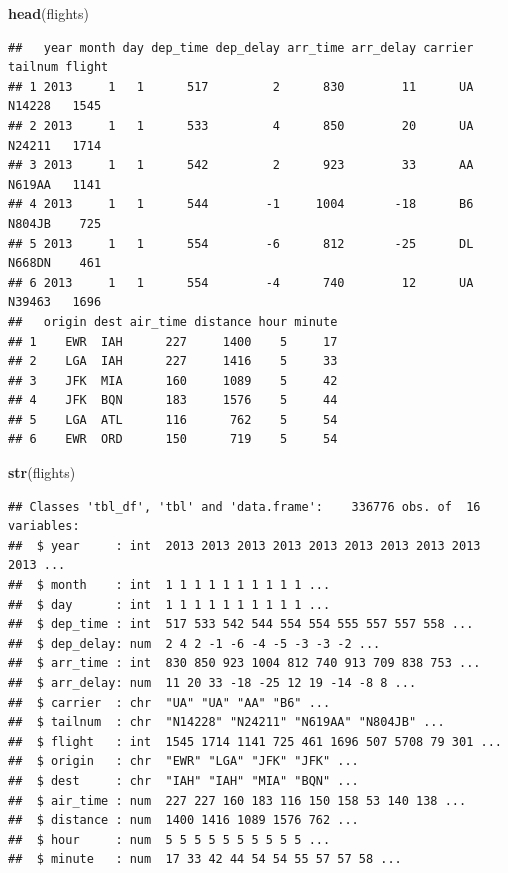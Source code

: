 \documentclass[]{book}
\newenvironment{Shaded}{\begin{snugshade}}{\end{snugshade}}
\newcommand{\KeywordTok}[1]{\textcolor[rgb]{0.13,0.29,0.53}{\textbf{{#1}}}}
\newcommand{\NormalTok}[1]{{#1}}
\begin{document}
\begin{Shaded}
\begin{Highlighting}[]
\KeywordTok{head}\NormalTok{(flights)}
\end{Highlighting}
\end{Shaded}

\begin{verbatim}
##   year month day dep_time dep_delay arr_time arr_delay carrier tailnum flight
## 1 2013     1   1      517         2      830        11      UA  N14228   1545
## 2 2013     1   1      533         4      850        20      UA  N24211   1714
## 3 2013     1   1      542         2      923        33      AA  N619AA   1141
## 4 2013     1   1      544        -1     1004       -18      B6  N804JB    725
## 5 2013     1   1      554        -6      812       -25      DL  N668DN    461
## 6 2013     1   1      554        -4      740        12      UA  N39463   1696
##   origin dest air_time distance hour minute
## 1    EWR  IAH      227     1400    5     17
## 2    LGA  IAH      227     1416    5     33
## 3    JFK  MIA      160     1089    5     42
## 4    JFK  BQN      183     1576    5     44
## 5    LGA  ATL      116      762    5     54
## 6    EWR  ORD      150      719    5     54
\end{verbatim}

\begin{Shaded}
\begin{Highlighting}[]
\KeywordTok{str}\NormalTok{(flights)}
\end{Highlighting}
\end{Shaded}

\begin{verbatim}
## Classes 'tbl_df', 'tbl' and 'data.frame':    336776 obs. of  16 variables:
##  $ year     : int  2013 2013 2013 2013 2013 2013 2013 2013 2013 2013 ...
##  $ month    : int  1 1 1 1 1 1 1 1 1 1 ...
##  $ day      : int  1 1 1 1 1 1 1 1 1 1 ...
##  $ dep_time : int  517 533 542 544 554 554 555 557 557 558 ...
##  $ dep_delay: num  2 4 2 -1 -6 -4 -5 -3 -3 -2 ...
##  $ arr_time : int  830 850 923 1004 812 740 913 709 838 753 ...
##  $ arr_delay: num  11 20 33 -18 -25 12 19 -14 -8 8 ...
##  $ carrier  : chr  "UA" "UA" "AA" "B6" ...
##  $ tailnum  : chr  "N14228" "N24211" "N619AA" "N804JB" ...
##  $ flight   : int  1545 1714 1141 725 461 1696 507 5708 79 301 ...
##  $ origin   : chr  "EWR" "LGA" "JFK" "JFK" ...
##  $ dest     : chr  "IAH" "IAH" "MIA" "BQN" ...
##  $ air_time : num  227 227 160 183 116 150 158 53 140 138 ...
##  $ distance : num  1400 1416 1089 1576 762 ...
##  $ hour     : num  5 5 5 5 5 5 5 5 5 5 ...
##  $ minute   : num  17 33 42 44 54 54 55 57 57 58 ...
\end{verbatim}
\end{document}
